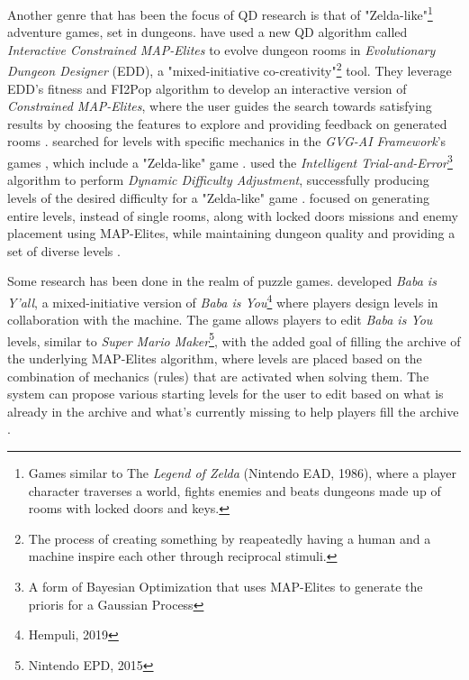 \documentclass{Configuration_Files/PoliMi3i_thesis}
\begin{document}
Another genre that has been the focus of QD research is that of "Zelda-like"\footnote{Games similar to The \textit{Legend of Zelda} (Nintendo EAD, 1986), where a player character traverses a world, fights enemies and beats dungeons made up of rooms with locked doors and keys.} adventure games, set in dungeons. 
\citeauthor{alvarez_empowering_2019} have used a new QD algorithm called \textit{Interactive Constrained MAP-Elites} to evolve dungeon rooms in \textit{Evolutionary Dungeon Designer} (EDD), a "mixed-initiative co-creativity"\footnote{The process of creating something by reapeatedly having a human and a machine inspire each other through reciprocal stimuli.} tool. They leverage EDD's fitness and FI2Pop algorithm to develop an interactive version of \textit{Constrained MAP-Elites}, where the user guides the search towards satisfying results by choosing the features to explore and providing feedback on generated rooms \cite{alvarez_empowering_2019}. 
\citeauthor{charity_mech-elites_2020} searched for levels with specific mechanics in the \textit{GVG-AI Framework}'s games \cite{perez-liebana_general_2019}, which include a "Zelda-like" game \cite{charity_mech-elites_2020}. 
 used the \textit{Intelligent Trial-and-Error}\footnote{A form of Bayesian Optimization that uses MAP-Elites to generate the prioris for a Gaussian Process} algorithm to perform \textit{Dynamic Difficulty Adjustment}, successfully producing levels of the desired difficulty for a "Zelda-like" game \cite{gonzalez-duque_finding_2020}. \citeauthor{viana_illuminating_2022} focused on generating entire levels, instead of single rooms, along with locked doors missions and enemy placement using MAP-Elites, while maintaining dungeon quality and providing a set of diverse levels \cite{viana_illuminating_2022}.

Some research has been done in the realm of puzzle games.  developed \textit{Baba is Y'all}, a mixed-initiative version of \textit{Baba is You}\footnote{Hempuli, 2019} where players design levels in collaboration with the machine. The game allows players to edit \textit{Baba is You} levels, similar to \textit{Super Mario Maker}\footnote{Nintendo EPD, 2015}, with the added goal of filling the archive of the underlying MAP-Elites algorithm, where levels are placed based on the combination of mechanics (rules) that are activated when solving them. The system can propose various starting levels for the user to edit based on what is already in the archive and what's currently missing to help players fill the archive \cite{charity_baba_2020}. 
\end{document}
